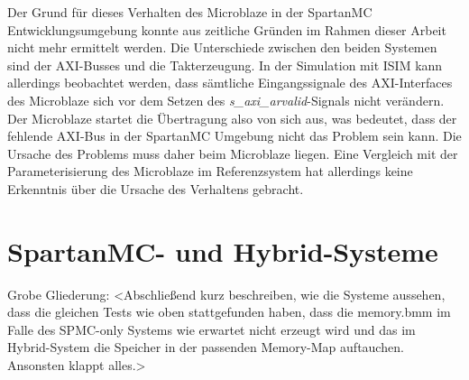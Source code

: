 Der Grund für dieses Verhalten des Microblaze in der SpartanMC Entwicklungsumgebung konnte aus zeitliche Gründen im Rahmen dieser Arbeit nicht mehr ermittelt werden. Die Unterschiede zwischen den beiden Systemen sind der AXI-Busses und die Takterzeugung. In der Simulation mit ISIM kann allerdings beobachtet werden, dass sämtliche Eingangssignale des AXI-Interfaces des Microblaze sich vor dem Setzen des \textit{s\_axi\_arvalid}-Signals nicht verändern. Der Microblaze startet die Übertragung also von sich aus, was bedeutet, dass der fehlende AXI-Bus in der SpartanMC Umgebung nicht das Problem sein kann. Die Ursache des Problems muss daher beim Microblaze liegen. Eine Vergleich mit der Parameterisierung des Microblaze im Referenzsystem hat allerdings keine Erkenntnis über die Ursache des Verhaltens gebracht.
\section{SpartanMC- und Hybrid-Systeme}
Grobe Gliederung:
<Abschließend kurz beschreiben, wie die Systeme aussehen, dass die gleichen Tests wie oben stattgefunden haben, dass die memory.bmm im Falle des SPMC-only Systems wie erwartet nicht erzeugt wird und das im Hybrid-System die Speicher in der passenden Memory-Map auftauchen. Ansonsten klappt alles.>